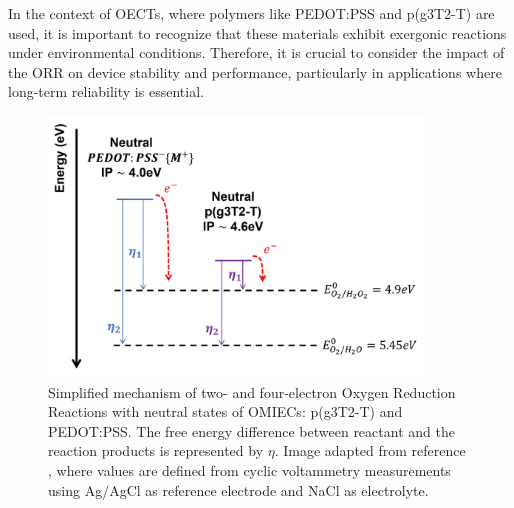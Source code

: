 In the context of OECTs, where polymers like PEDOT:PSS and p(g3T2-T) are used, it is important to recognize that these materials exhibit exergonic reactions under environmental conditions. Therefore, it is crucial to consider the impact of the ORR on device stability and performance, particularly in applications where long-term reliability is essential.

\begin{figure}[!ht]
	\centering
	\includegraphics[width=10cm]{Images/pdf/ORR.pdf}
	\caption[Energy levels of neutral state of OMIECs related to oxygen reduction reactions potentials]{Simplified mechanism of two- and four-electron Oxygen Reduction Reactions with neutral states of OMIECs: p(g3T2-T) and PEDOT:PSS. The free energy difference between reactant and the reaction products is represented by $\eta$. Image adapted from reference \cite{giovannittiEnergeticControlRedoxActive2020}, where values are defined from cyclic voltammetry measurements using Ag/AgCl as reference electrode and NaCl as electrolyte.}
	\label{fig:orr}
\end{figure}




